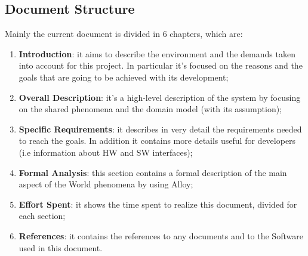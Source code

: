 \vspace{1\baselineskip}
\subsection{Document Structure}
Mainly the current document is divided in 6 chapters, which are:
\begin{enumerate}
    \item \textbf{Introduction}: it aims to describe the environment and the demands taken into account for this project. In particular it’s focused on the reasons and the goals that are going to be achieved with its development;
    \item \textbf{Overall Description}: it’s a high-level description of the system by focusing on the shared phenomena and the domain model (with its assumption);
    \item \textbf{Specific Requirements}: it describes in very detail the requirements needed to reach the goals. In addition it contains more details useful for developers (i.e information about HW and SW interfaces);
    \item \textbf{Formal Analysis}: this section contains a formal description of the main aspect of the World phenomena by using Alloy;
    \item \textbf{Effort Spent}:  it shows the time spent to realize this document, divided for each section;
    \item \textbf{References}:  it contains the references to any documents and to the Software used in this document.
\end{enumerate}



